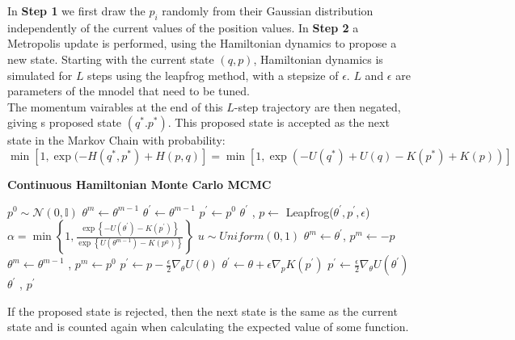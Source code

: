 \documentclass[]{report}
\begin{document}
In \textbf{Step 1} we first draw the $p_{i}$ randomly from their Gaussian distribution independently of the current values of the position values. 
In \textbf{Step 2} a Metropolis update is performed, using the Hamiltonian dynamics to propose a new state. Starting with the current state $(q,p)$, Hamiltonian dynamics is simulated for $L$ steps using the leapfrog method, with a stepsize of $\epsilon$. $L$ and $\epsilon$ are parameters of the mnodel that need to be tuned.\\
The momentum vairables at the end of this $L$-step trajectory are then negated, giving s proposed state $(q^{*}. p^{*})$. This proposed state is accepted as the next state in the Markov Chain with probability: \begin{equation}
\min[1, \exp(-H(q^{*}, p^{*}) + H(p,q)] = \min[1, \exp(-U(q^{*}) + U(q) - K(p^{*}) + K(p))]
\end{equation} 
\begin{algorithm}
	\label{alg:simpHMC}
	\caption{\textbf{Continuous Hamiltonian Monte Carlo MCMC}}
		\begin{algorithmic}[1]
			\State $ p^{0} \sim \mathcal{N}(0,\mathbb{I})$
			\State $ \theta^{m} \gets \theta^{m-1}$
			\State $\theta^{'} \gets \theta^{m-1}$
			\State $ p^{'} \gets p^{0}$
			\State $\theta^{'}$ , $p \gets$ Leapfrog($\theta^{'}, p^{'}, \epsilon$)
			\EndFor
			\State $\alpha = \min\left\{1, \frac{\exp \left\{-U(\theta^{'}) - K(p^{'})\right\}}{\exp \left\{U(\theta^{m-1}) - K(p^{0})\right\}}\right\}$ 
			\State $u \sim Uniform(0,1)$
			\State \Return $ \theta^{m} \gets \theta^{'}$, $p^{m} \gets -p $  
			\Else
			\State \Return $\theta^{m}  \gets \theta^{m-1}$ , $p^{m} \gets p^{0}$ 
			\EndIf
			\EndFor
			\State $p^{'} \gets p - \frac{\epsilon}{2}\nabla_{\theta} U(\theta)$ 
			\State $\theta^{'} \gets \theta + \epsilon \nabla_{p} K(p^{'})$  
			\State $p^{'} \gets \frac{\epsilon}{2}\nabla_{\theta}U(\theta^{'})$ 
			\State \Return $\theta^{'}$ , $p^{'}$
	\end{algorithmic} 
\end{algorithm}
If the proposed state is rejected, then the next state is the same as the current state and is counted again when calculating the expected value of some function. 
\end{document}
